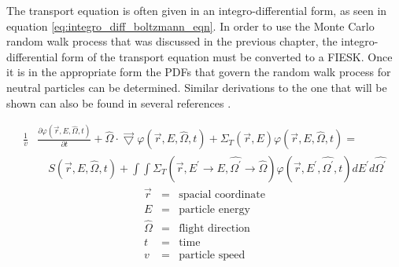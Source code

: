 The transport equation is often given in an integro-differential form, as seen 
in equation \ref{eq:integro_diff_boltzmann_eqn}. In order to use the Monte 
Carlo random walk process that was discussed in the previous chapter, the 
integro-differential form of the transport equation must be converted to a 
FIESK. Once it is in the appropriate form the PDFs that govern the random walk 
process for neutral particles can be determined. Similar derivations to the one 
that will be shown can also be found in several references \citep{lewis_computational_1993, hoogenboom_adjoint_1977, irving_adjoint_1971, bell_nuclear_1979}.
 
\begin{equation}
  \begin{split}
    \frac{1}{v}&\frac{\partial \varphi(\vec{r},E,\hat{\Omega},t)}{\partial t} +
    \hat{\Omega} \cdot \vec{\bigtriangledown} \varphi(\vec{r},E,\hat{\Omega},t)
    + \Sigma_T(\vec{r},E) \varphi(\vec{r},E,\hat{\Omega},t) = \\
    & \quad S(\vec{r},E,\hat{\Omega},t) +
    \int\int \Sigma_T(\vec{r},E^{'} \to E,\hat{\Omega^{'}} \to \hat{\Omega})
    \varphi(\vec{r},E^{'},\hat{\Omega^{'}},t) dE^{'}d\hat{\Omega^{'}} 
  \end{split}
  \label{eq:integro_diff_boltzmann_eqn}
\end{equation}
\begin{eqnarray*}
  \vec{r} & = & \text{spacial coordinate} \nonumber \\
  E & = & \text{particle energy} \nonumber \\
  \hat{\Omega} & = & \text{flight direction} \nonumber \\
  t & = & \text{time} \nonumber \\
  v & = & \text{particle speed} \nonumber \\
\end{eqnarray*}

